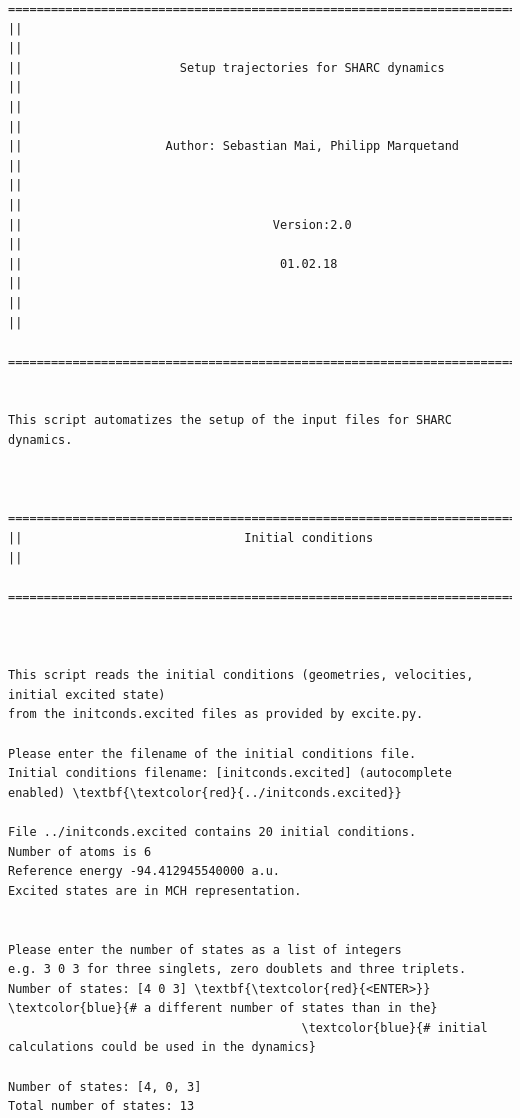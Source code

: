 \documentclass[a4paper,11pt,DIV=15,openany]{scrbook}
\begin{document}
\begin{oframed}
\footnotesize\begin{Verbatim}[commandchars=\\\{\}]
  ================================================================================
||                                                                                ||
||                      Setup trajectories for SHARC dynamics                     ||
||                                                                                ||
||                    Author: Sebastian Mai, Philipp Marquetand                   ||
||                                                                                ||
||                                   Version:2.0                                  ||
||                                    01.02.18                                    ||
||                                                                                ||
  ================================================================================


This script automatizes the setup of the input files for SHARC dynamics.
  

  ================================================================================
||                               Initial conditions                               ||
  ================================================================================



This script reads the initial conditions (geometries, velocities, initial excited state)
from the initconds.excited files as provided by excite.py.

Please enter the filename of the initial conditions file.
Initial conditions filename: [initconds.excited] (autocomplete enabled) \textbf{\textcolor{red}{../initconds.excited}}

File ../initconds.excited contains 20 initial conditions.
Number of atoms is 6
Reference energy -94.412945540000 a.u.
Excited states are in MCH representation.


Please enter the number of states as a list of integers
e.g. 3 0 3 for three singlets, zero doublets and three triplets.
Number of states: [4 0 3] \textbf{\textcolor{red}{<ENTER>}}        \textcolor{blue}{# a different number of states than in the}
                                         \textcolor{blue}{# initial calculations could be used in the dynamics}

Number of states: [4, 0, 3]
Total number of states: 13


\end{Verbatim}
\end{oframed}
\end{document}

